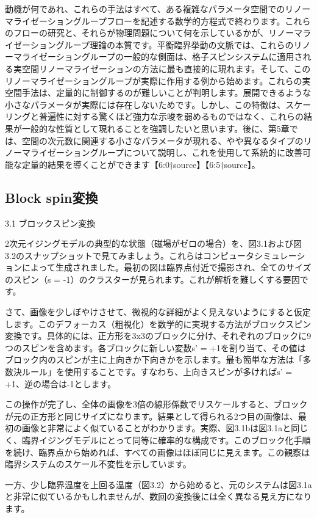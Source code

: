 \documentclass[a4paper,10pt]{ltjsarticle} %
\begin{document}
動機が何であれ、これらの手法はすべて、ある複雑なパラメータ空間でのリノーマライゼーショングループフローを記述する数学的方程式で終わります。これらのフローの研究と、それらが物理問題について何を示しているかが、リノーマライゼーショングループ理論の本質です。平衡臨界挙動の文脈では、これらのリノーマライゼーショングループの一般的な側面は、格子スピンシステムに適用される実空間リノーマライゼーションの方法に最も直接的に現れます。そして、このリノーマライゼーショングループが実際に作用する例から始めます。これらの実空間手法は、定量的に制御するのが難しいことが判明します。展開できるような小さなパラメータが実際には存在しないためです。しかし、この特徴は、スケーリングと普遍性に対する驚くほど強力な示唆を弱めるものではなく、これらの結果が一般的な性質として現れることを強調したいと思います。後に、第5章では、空間の次元数に関連する小さなパラメータが現れる、やや異なるタイプのリノーマライゼーショングループについて説明し、これを使用して系統的に改善可能な定量的結果を導くことができます【6:0†source】【6:5†source】。


\subsection{Block spin変換}
3.1 ブロックスピン変換

2次元イジングモデルの典型的な状態（磁場がゼロの場合）を、図3.1および図3.2のスナップショットで見てみましょう。これらはコンピュータシミュレーションによって生成されました。最初の図は臨界点付近で撮影され、全てのサイズのスピン（s = -1）のクラスターが見られます。これが解析を難しくする要因です。

さて、画像を少しぼやけさせて、微視的な詳細がよく見えないようにすると仮定します。このデフォーカス（粗視化）を数学的に実現する方法がブロックスピン変換です。具体的には、正方形を3x3のブロックに分け、それぞれのブロックに9つのスピンを含めます。各ブロックに新しい変数s' = +1を割り当て、その値はブロック内のスピンが主に上向きか下向きかを示します。最も簡単な方法は「多数決ルール」を使用することです。すなわち、上向きスピンが多ければs' = +1、逆の場合は-1とします。

この操作が完了し、全体の画像を3倍の線形係数でリスケールすると、ブロックが元の正方形と同じサイズになります。結果として得られる2つ目の画像は、最初の画像と非常によく似ていることがわかります。実際、図3.1bは図3.1aと同じく、臨界イジングモデルにとって同等に確率的な構成です。このブロック化手順を続け、臨界点から始めれば、すべての画像はほぼ同じに見えます。この観察は臨界システムのスケール不変性を示しています。

一方、少し臨界温度を上回る温度（図3.2）から始めると、元のシステムは図3.1aと非常に似ているかもしれませんが、数回の変換後には全く異なる見え方になります。
\end{document}
